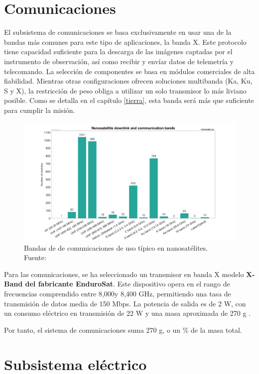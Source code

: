 \section{Comunicaciones}

El subsistema de comunicaciones se basa exclusivamente en usar una de la bandas más comunes para este tipo de aplicaciones, la banda X. Este protocolo tiene capacidad suficiente para la descarga de las imágenes captadas por el instrumento de observación, así como recibir y envíar datos de telemetría y telecomando. La selección de componentes se basa en módulos comerciales de alta fiabilidad. Mientras otras configuraciones ofrecen soluciones multibanda (Ka, Ku, S y X), la restricción de peso obliga a utilizar un solo transmisor lo más liviano posible. Como se detalla en el capítulo \ref{tierra}, esta banda será más que suficiente para cumplir la misión.

\begin{figure}[H]
    \centering
    \includegraphics[width=0.7\linewidth]{5.Mission/Nanosats_frequency_2025-04-30_large.png}
    \caption{Bandas de de comunicaciones de uso típico en nanosatélites.  \\Fuente: \cite{kulu2025nanosats}}
\end{figure}


 Para las comunicaciones, se ha seleccionado un transmisor en banda X modelo \textbf{X-Band del fabricante EnduroSat}. Este dispositivo opera en el rango de frecuencias comprendido entre 8,000y 8,400 GHz, permitiendo una tasa de transmisión de datos media de 150 Mbps. La potencia de salida es de 2 W, con un consumo eléctrico en transmisión de 22 W y una masa aproximada de 270 g \cite{endurosat_xband_2025}.

Por tanto, el sistema de comunicaciones suma 270 g, o un \% de la masa total.

\section{Subsistema eléctrico}

